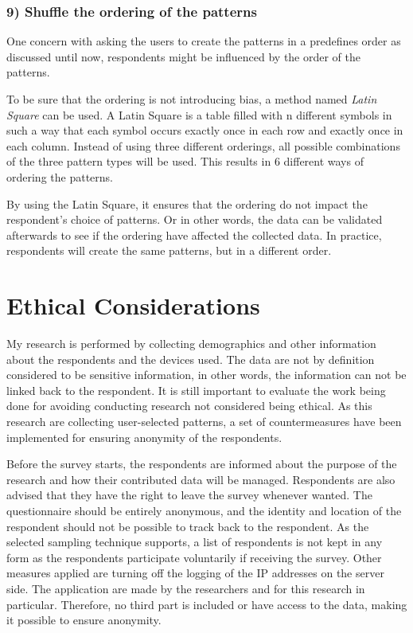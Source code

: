     \subsubsection*{9) Shuffle the ordering of the patterns}
    One concern with asking the users to create the patterns in a predefines order as discussed until now, respondents might be influenced by the order of the patterns. 

    To be sure that the ordering is not introducing bias, a method named {\it Latin Square} can be used. A Latin Square is a table filled with n different symbols in such a way that each symbol occurs exactly once in each row and exactly once in each column. Instead of using three different orderings, all possible combinations of the three pattern types will be used. This results in 6 different ways of ordering the patterns.

    By using the Latin Square, it ensures that the ordering do not impact the respondent's choice of patterns. Or in other words, the data can be validated afterwards to see if the ordering have affected the collected data. In practice, respondents will create the same patterns, but in a different order. 

  \clearpage
  \section{Ethical Considerations}\label{sec:ethics}
    
    My research is performed by collecting demographics and other information about the respondents and the devices used. The data are not by definition considered to be sensitive information, in other words, the information can not be linked back to the respondent. It is still important to evaluate the work being done for avoiding conducting research not considered being ethical. As this research are collecting user-selected patterns, a set of countermeasures have been implemented for ensuring anonymity of the respondents. 

    Before the survey starts, the respondents are informed about the purpose of the research and how their contributed data will be managed. Respondents are also advised that they have the right to leave the survey whenever wanted. The questionnaire should be entirely anonymous, and the identity and location of the respondent should not be possible to track back to the respondent. As the selected sampling technique supports, a list of respondents is not kept in any form as the respondents participate voluntarily if receiving the survey. Other measures applied are turning off the logging of the IP addresses on the server side. The application are made by the researchers and for this research in particular. Therefore, no third part is included or have access to the data, making it possible to ensure anonymity. 

